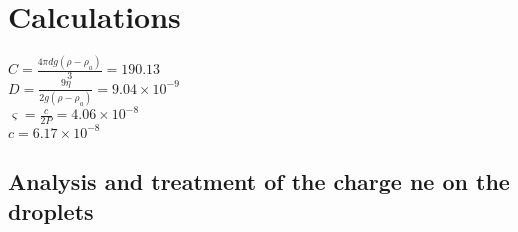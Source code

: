 \section{Calculations}
	\noindent $C = \frac{4\pi dg(\rho-\rho_a)}{3} = 190.13$\\
	$D = \frac{9\eta}{2g(\rho-\rho_a)} = 9.04\times 10^{-9}$\\
	$\varsigma = \frac{c}{2P} = 4.06\times 10^{-8}$\\
	$c = 6.17\times 10^{-8}$

	
	

	\subsection{Analysis and treatment of the charge ne on the droplets}
		
		
